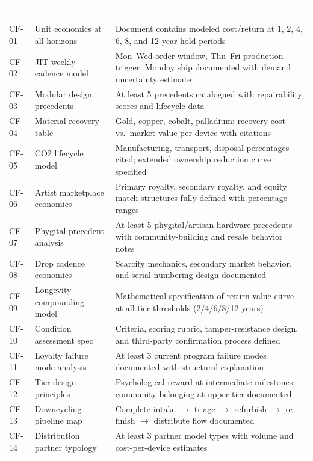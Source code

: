 \documentclass[11pt,letterpaper]{article}
\newcommand{\tableheader}[1]{\textbf{\sffamily\textcolor{white}{#1}}}
\begin{document}
\begin{center}
\begin{tabularx}{\textwidth}{C{1.5cm}XL{4.5cm}}
\toprule
{}
\tableheader{ID} & \tableheader{Verifies} & \tableheader{Expected} \\
\midrule
CF-01 & Unit economics at all horizons & Document contains modeled cost/return at 1, 2, 4, 6, 8, and 12-year hold periods \\
CF-02 & JIT weekly cadence model & Mon--Wed order window, Thu--Fri production trigger, Monday ship documented with demand uncertainty estimate \\
CF-03 & Modular design precedents & At least 5 precedents catalogued with repairability scores and lifecycle data \\
CF-04 & Material recovery table & Gold, copper, cobalt, palladium: recovery cost vs.\ market value per device with citations \\
CF-05 & CO2 lifecycle model & Manufacturing, transport, disposal percentages cited; extended ownership reduction curve specified \\
CF-06 & Artist marketplace economics & Primary royalty, secondary royalty, and equity match structures fully defined with percentage ranges \\
CF-07 & Phygital precedent analysis & At least 5 phygital/artisan hardware precedents with community-building and resale behavior notes \\
CF-08 & Drop cadence economics & Scarcity mechanics, secondary market behavior, and serial numbering design documented \\
CF-09 & Longevity compounding model & Mathematical specification of return-value curve at all tier thresholds (2/4/6/8/12 years) \\
CF-10 & Condition assessment spec & Criteria, scoring rubric, tamper-resistance design, and third-party confirmation process defined \\
CF-11 & Loyalty failure mode analysis & At least 3 current program failure modes documented with structural explanation \\
CF-12 & Tier design principles & Psychological reward at intermediate milestones; community belonging at upper tier documented \\
CF-13 & Downcycling pipeline map & Complete intake $\to$ triage $\to$ refurbish $\to$ re-finish $\to$ distribute flow documented \\
CF-14 & Distribution partner typology & At least 3 partner model types with volume and cost-per-device estimates \\

\end{tabularx}
\end{center}
\end{document}
